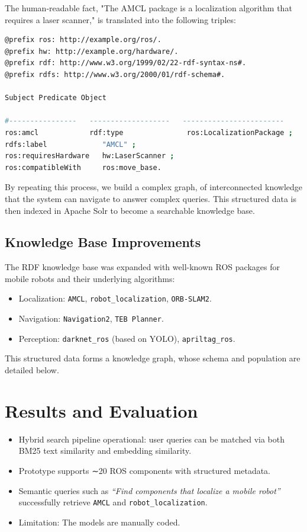 \documentclass[rnd]{mas_proposal}
\begin{document}
\begin{tcolorbox}
The human-readable fact, "The AMCL package is a localization algorithm that requires a laser scanner," is translated into the following triples:
\begin{lstlisting}[language=bash]
@prefix ros: http://example.org/ros/.
@prefix hw: http://example.org/hardware/.
@prefix rdf: http://www.w3.org/1999/02/22-rdf-syntax-ns#.
@prefix rdfs: http://www.w3.org/2000/01/rdf-schema#.

Subject Predicate Object

#----------------   -------------------   ------------------------
ros:amcl            rdf:type               ros:LocalizationPackage ;
rdfs:label             "AMCL" ;
ros:requiresHardware   hw:LaserScanner ;
ros:compatibleWith     ros:move_base.
\end{lstlisting}
By repeating this process, we build a complex graph, of interconnected knowledge that the system can navigate to answer complex queries. This structured data is then indexed in Apache Solr to become a searchable knowledge base.
\end{tcolorbox}

\subsection{Knowledge Base Improvements}
The RDF knowledge base was expanded with well-known ROS packages for mobile robots and their underlying algorithms:
\begin{itemize}
\item Localization: \texttt{AMCL}, \texttt{robot_localization}, \texttt{ORB-SLAM2}.
\item Navigation: \texttt{Navigation2}, \texttt{TEB Planner}.
\item Perception: \texttt{darknet_ros} (based on YOLO), \texttt{apriltag_ros}.
\end{itemize}
This structured data forms a knowledge graph, whose schema and population are detailed below.

\section{Results and Evaluation}
\begin{itemize}
\item Hybrid search pipeline operational: user queries can be matched via both BM25 text similarity and embedding similarity.
\item Prototype supports ∼20 ROS components with structured metadata.
\item Semantic queries such as \textit{``Find components that localize a mobile robot''} successfully retrieve \texttt{AMCL} and \texttt{robot_localization}.
\item Limitation: The models are manually coded.
\end{itemize}
\end{document}
